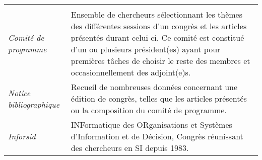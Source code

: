 \begin{longtable}{>{\itshape}p{}p{}}
		\vspace{2mm}\\
		Comité de programme & Ensemble de chercheurs sélectionnant les  thèmes des différentes sessions d\rq{}un congrès et les articles présentés durant celui-ci. Ce comité est constitué d\rq{}un ou plusieurs président(es) ayant pour premières tâches de choisir le reste des membres et occasionnellement des adjoint(e)s.
		\vspace{2mm}\\
		Notice bibliographique & Recueil de nombreuses données concernant une édition de congrès, telles que les articles présentés ou la composition du comité de programme.
		\vspace{2mm}\\
		Inforsid	& INFormatique des ORganisations et Systèmes d\rq{}Information et de Décision, Congrès réunissant des chercheurs en SI depuis 1983.
	\end{longtable}



